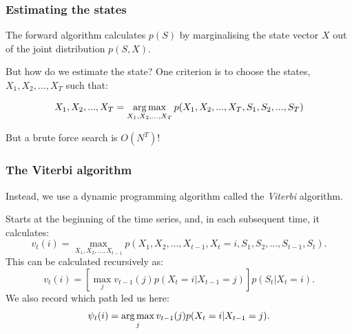 \documentclass[main.tex]{subfiles}
\begin{document}
\begin{frame}
\frametitle{Estimating the states}

The forward algorithm calculates $p(S)$ by marginalising the state vector $X$ out of the joint distribution $p(S,X)$.

\vspace{0.5cm}

But how do we estimate the state? One criterion is to choose the states, $X_1,X_2,...,X_T$ such that:

\vspace{0.5cm}

\begin{equation}
    X_1, X_2, ..., X_T = \operatorname*{arg\,max}_{X_1, X_2, ..., X_T}{p(X_1,X_2,...,X_T,S_1, S_2,...,S_T)}
\end{equation}

\vspace{0.5cm}

But a brute force search is $O(N^T)$!

\end{frame}

\begin{frame}
\frametitle{The Viterbi algorithm}

Instead, we use a dynamic programming algorithm called the \textit{Viterbi} algorithm.

\vspace{0.5cm}

Starts at the beginning of the time series, and, in each subsequent time, it calculates:
%
\begin{equation}
    v_t(i) = \max_{X_1, X_2, ..., X_{t-1}} p(X_1, X_2, ..., X_{t-1}, X_t=i, S_1, S_2, ..., S_{t-1}, S_t).
\end{equation}
%
This can be calculated recursively as:
%
\begin{equation}
    v_t(i) = \left[\max_{j} v_{t-1}(j) p(X_t=i|X_{t-1}=j)\right] p(S_t|X_t=i).
\end{equation}
%
We also record which path led us here:
%
\begin{equation}
    \psi_t(i) = \operatorname*{arg\,max}_{j} v_{t-1}(j) p(X_t=i|X_{t-1}=j).
\end{equation}
    
\end{frame}
\end{document}
